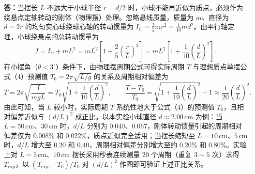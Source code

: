 \documentclass[12pt,a4paper,fontset=fandol]{ctexart}
\begin{document}
\noindent\textbf{答：}当摆长 $L$ 不远大于小球半径 $r=d/2$ 时，小球不能再近似为质点，必须作为绕悬点定轴转动的刚体（物理摆）处理。忽略悬线质量，质量为 $m$、直径为 $d=2r$ 的均匀实心球绕球心轴的转动惯量为 $I_C=\frac{2}{5}mr^2=\frac{1}{10}md^2$。由平行轴定理，小球绕悬点的总转动惯量为
\[
I=I_C+mL^2=mL^2\left[1+\frac{2}{5}\left(\frac{r}{L}\right)^2\right]
=mL^2\left[1+\frac{1}{10}\left(\frac{d}{L}\right)^2\right].
\]
在小摆角（$\theta<3^\circ$）条件下，由物理摆周期公式可得实际周期 $T$ 与理想质点单摆公式（4）预测值 $T_0=2\pi\sqrt{L/g}$ 的关系及周期相对偏差为
\[
T=2\pi\sqrt{\frac{I}{mgL}}
=T_0\sqrt{1+\frac{1}{10}\left(\frac{d}{L}\right)^2},\qquad
\frac{T-T_0}{T_0}=\sqrt{1+\frac{1}{10}\left(\frac{d}{L}\right)^2}-1
\approx\frac{1}{20}\left(\frac{d}{L}\right)^2.
\]
由此可知，当 $L$ 较小时，实际周期 $T$ 系统性地大于公式（4）的预测值 $T_0$，且相对偏差近似与 $(d/L)^2$ 成正比。以本实验小球直径 $d\approx2.00\,\mathrm{cm}$ 为例：当 $L=50\,\mathrm{cm}$、$30\,\mathrm{cm}$ 时，$d/L$ 分别为 $0.040$、$0.067$，刚体转动惯量引起的周期相对偏差仅为 $0.008\%$ 和 $0.022\%$，质点近似完全适用；当摆长缩短至 $L=10\,\mathrm{cm}$、$5\,\mathrm{cm}$ 时，$d/L$ 增大至 $0.20$ 和 $0.40$，周期相对偏差分别增大至约 $0.20\%$ 和 $0.80\%$。实验上对 $L=5\,\mathrm{cm}$、$10\,\mathrm{cm}$ 摆长采用秒表连续测量 $20$ 个周期（重复 $3\sim5$ 次）求得 $T_{\mathrm{exp}}$，以 $(T_{\mathrm{exp}}-T_0)/T_0$ 对 $(d/L)^2$ 作图即可验证上述正比关系。
\end{document}
